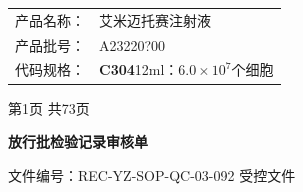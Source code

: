 \documentclass[UTF8,10pt,a4paper,fontset=fandol]{ctexart}
\newcommand{\fieldvalue}[1]{#1}
\newcommand{\handwritten}[1]{#1}
\begin{document}
\vspace{2cm}

\begin{center}
\begin{tabular}{rl}
产品名称：&
\fieldvalue{艾米迈托赛注射液}\\[1.5em]
产品批号：&
\fieldvalue{\handwritten{A23220?00}}\\[1.5em]
代码规格：&
\fieldvalue{\textbf{C304}\quad 12ml：$6.0\times 10^{7}$个细胞}
\end{tabular}
\end{center}

\vfill

\begin{center}
第1页 共73页
\end{center}

\newpage

\begin{center}
\textbf{放行批检验记录审核单}
\end{center}

\noindent
文件编号：REC-YZ-SOP-QC-03-092 \hfill 受控文件
\end{document}
